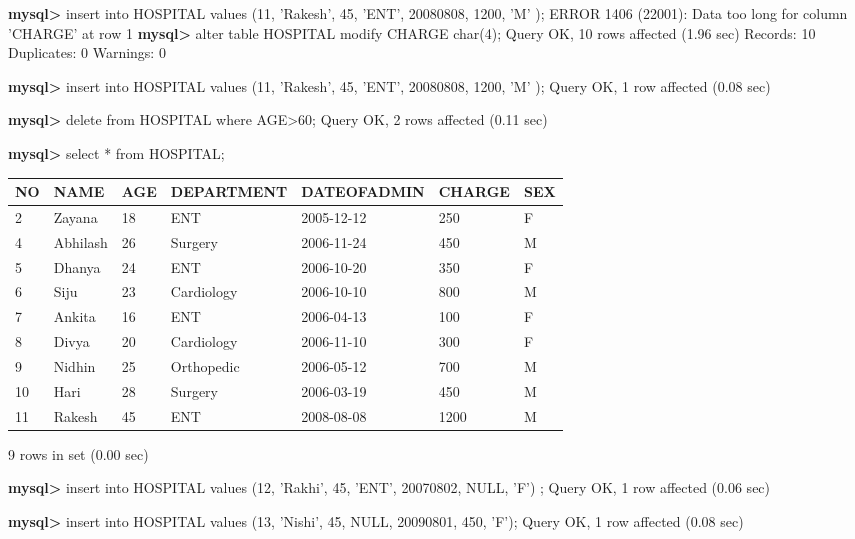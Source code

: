 \documentclass[11pt]{article}
\begin{document}
\textbf{mysql>} insert into HOSPITAL values (11, 'Rakesh', 45, 'ENT', 20080808, 1200, 'M'
);
ERROR 1406 (22001): Data too long for column 'CHARGE' at row 1
\textbf{mysql>} alter table HOSPITAL modify CHARGE char(4);
Query OK, 10 rows affected (1.96 sec)
Records: 10  Duplicates: 0  Warnings: 0

\textbf{mysql>} insert into HOSPITAL values (11, 'Rakesh', 45, 'ENT', 20080808, 1200, 'M'
);
Query OK, 1 row affected (0.08 sec)

\textbf{mysql>} delete from HOSPITAL where AGE>60;
Query OK, 2 rows affected (0.11 sec)

\textbf{mysql>} select * from HOSPITAL;
\begin{center}
\begin{tabular}{|l|l|l|l|l|l|l|}
\hline
NO & NAME & AGE & DEPARTMENT & DATEOFADMIN & CHARGE & SEX \\
\hline
2 & Zayana & 18 & ENT & 2005-12-12 & 250 & F \\
4 & Abhilash & 26 & Surgery & 2006-11-24 & 450 & M \\
5 & Dhanya & 24 & ENT & 2006-10-20 & 350 & F \\
6 & Siju & 23 & Cardiology & 2006-10-10 & 800 & M \\
7 & Ankita & 16 & ENT & 2006-04-13 & 100 & F \\
8 & Divya & 20 & Cardiology & 2006-11-10 & 300 & F \\
9 & Nidhin & 25 & Orthopedic & 2006-05-12 & 700 & M \\
10 & Hari & 28 & Surgery & 2006-03-19 & 450 & M \\
11 & Rakesh & 45 & ENT & 2008-08-08 & 1200 & M \\
\hline
\end{tabular}
\end{center}
9 rows in set (0.00 sec)

\textbf{mysql>} insert into HOSPITAL values (12, 'Rakhi', 45, 'ENT', 20070802, NULL, 'F')
;
Query OK, 1 row affected (0.06 sec)

\textbf{mysql>} insert into HOSPITAL values (13, 'Nishi', 45, NULL, 20090801, 450, 'F');
Query OK, 1 row affected (0.08 sec)
\end{document}
